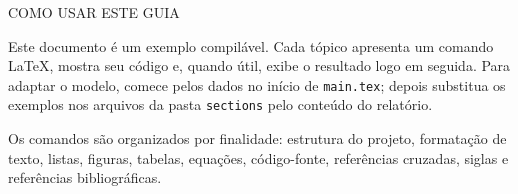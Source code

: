\newpage
\thispagestyle{empty}
\begin{center}
    \uppercase{Como usar este guia}
\end{center}

Este documento é um exemplo compilável. Cada tópico apresenta um comando \LaTeX,
mostra seu código e, quando útil, exibe o resultado logo em seguida. Para adaptar o
modelo, comece pelos dados no início de \texttt{main.tex}; depois substitua os
exemplos nos arquivos da pasta \texttt{sections} pelo conteúdo do relatório.

Os comandos são organizados por finalidade: estrutura do projeto, formatação de
texto, listas, figuras, tabelas, equações, código-fonte, referências cruzadas,
siglas e referências bibliográficas.
